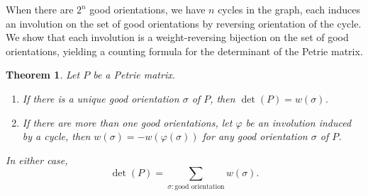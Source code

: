 \documentclass[pdflatex,sn-mathphys-num]{sn-jnl}%
\theoremstyle{thmstyleone}%
\newtheorem{theorem}{Theorem}[section]
\theoremstyle{thmstyletwo}%
\theoremstyle{thmstylethree}%
\numberwithin{equation}{section}
\begin{document}
        When there are $2^n$ good orientations, we have $n$ cycles in the graph, each induces an involution on the set of good orientations by reversing orientation of the cycle. We show that each involution is a weight-reversing bijection on the set of good orientations, yielding a counting formula for the determinant of the Petrie matrix.
        \begin{theorem}\label{thm:PetWeightInvo}
            Let $P$ be a Petrie matrix. 

            \begin{enumerate}
                \item If there is a unique good orientation $\sigma$ of $P$, then $\det(P)=w(\sigma)$.
                \item If there are more than one good orientations, let $\varphi$ be an involution induced by a cycle, then $w(\sigma)=-w(\varphi(\sigma))$ for any good orientation $\sigma$ of $P$.
            \end{enumerate}
            In either case,
            \[\det(P)=\sum_{\sigma:\text{good orientation}} w(\sigma).\]
        \end{theorem}
\end{document}
